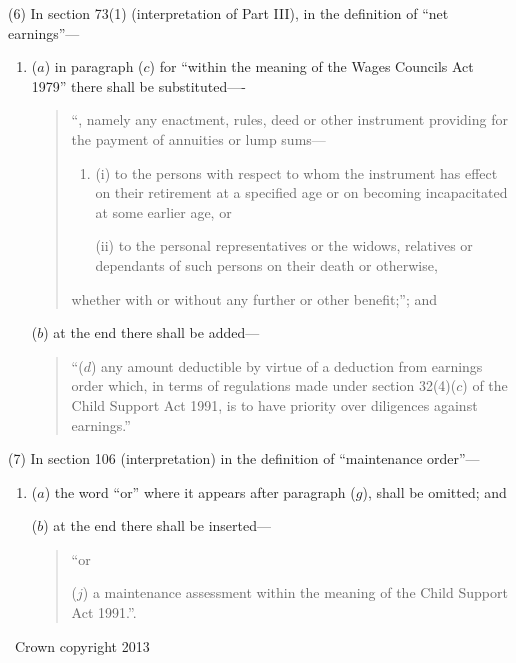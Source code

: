 \documentclass[a4paper]{article}
\begin{document}
(6) In section 73(1) (interpretation of Part III), in the definition of “net earnings”---
\begin{enumerate}\item[]
($a$) in paragraph ($c$) for “within the meaning of the Wages Councils Act 1979” there shall be substituted----
\begin{quotation}  “, namely any enactment, rules, deed or other instrument providing for the payment of annuities or lump sums---
\begin{enumerate}\item[]
(i) to the persons with respect to whom the instrument has effect on their retirement at a specified age or on becoming incapacitated at some earlier age, or

(ii) to the personal representatives or the widows, relatives or dependants of such persons on their death or otherwise,
\end{enumerate}
whether with or without any further or other benefit;”; and
\end{quotation}

($b$) at the end there shall be added—
\begin{quotation}
“($d$) any amount deductible by virtue of a deduction from earnings order which, in terms of regulations made under section 32(4)($c$) of the Child Support Act 1991, is to have priority over diligences against earnings.”
\end{quotation}
\end{enumerate}

(7) In section 106 (interpretation) in the definition of “maintenance order”—
\begin{enumerate}\item[]
($a$) the word “or” where it appears after paragraph ($g$), shall be omitted; and

($b$) at the end there shall be inserted---
\begin{quotation}  “or

($j$) a maintenance assessment within the meaning of the Child Support Act 1991.”.
\end{quotation}
\end{enumerate}



\begin{center}
\textcopyright\ Crown copyright 2013
\end{center}
\end{document}
